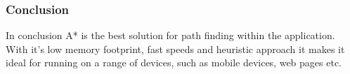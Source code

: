 \subsubsection{Conclusion}
In conclusion A* is the best solution for path finding within the application. With it's low memory footprint, fast speeds and heuristic approach it makes it ideal for running on a range of devices, such as mobile devices, web pages etc.